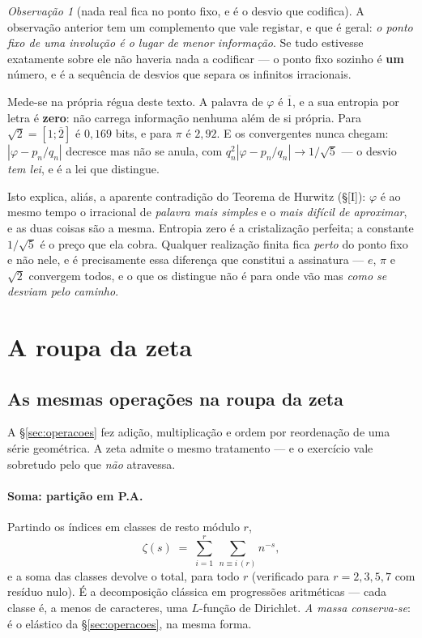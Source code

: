 \documentclass[11pt,a4paper]{article}
\theoremstyle{plain}
\theoremstyle{definition}
\theoremstyle{remark}
\newtheorem{obs}[teorema]{Observação}
\begin{document}
\begin{obs}[nada real fica no ponto fixo, e é o desvio que codifica]\label{obs:desvio}
A observação anterior tem um complemento que vale registar, e que é geral: \emph{o ponto fixo de
uma involução é o lugar de menor informação}. Se tudo estivesse exatamente sobre ele não haveria
nada a codificar --- o ponto fixo sozinho é \textbf{um} número, e é a sequência de desvios que
separa os infinitos irracionais.

Mede-se na própria régua deste texto. A palavra de $\varphi$ é $\overline{1}$, e a sua entropia por
letra é \textbf{zero}: não carrega informação nenhuma além de si própria. Para $\sqrt2 =
[1;\overline{2}]$ é $0{,}169$ bits, e para $\pi$ é $2{,}92$. E os convergentes nunca chegam:
$|\varphi - p_n/q_n|$ decresce mas não se anula, com $q_n^2|\varphi-p_n/q_n| \to 1/\sqrt5$ --- o
desvio \emph{tem lei}, e é a lei que distingue.

Isto explica, aliás, a aparente contradição do Teorema de Hurwitz (\S[I]): $\varphi$ é
ao mesmo tempo o irracional de \emph{palavra mais simples} e o \emph{mais difícil de aproximar}, e
as duas coisas são a mesma. Entropia zero é a cristalização perfeita; a constante $1/\sqrt5$ é o
preço que ela cobra. Qualquer realização finita fica \emph{perto} do ponto fixo e não nele, e é
precisamente essa diferença que constitui a assinatura --- $e$, $\pi$ e $\sqrt2$ convergem todos,
e o que os distingue não é para onde vão mas \emph{como se desviam pelo caminho}.
\end{obs}


\section{A roupa da zeta}\label{sec:zetacap}

\subsection{As mesmas operações na roupa da zeta}\label{sec:zetaelastica}

A \S\ref{sec:operacoes} fez adição, multiplicação e ordem por reordenação de uma série geométrica.
A zeta admite o mesmo tratamento --- e o exercício vale sobretudo pelo que \emph{não} atravessa.

\paragraph{Soma: partição em P.A.} Partindo os índices em classes de resto módulo $r$,
\[
  \zeta(s) \;=\; \sum_{i=1}^{r} \ \sum_{n\equiv i \,(r)} n^{-s} ,
\]
e a soma das classes devolve o total, para todo $r$ (verificado para $r=2,3,5,7$ com resíduo nulo).
É a decomposição clássica em progressões aritméticas --- cada classe é, a menos de caracteres, uma
$L$-função de Dirichlet. \emph{A massa conserva-se}: é o elástico da \S\ref{sec:operacoes}, na
mesma forma.
\end{document}
